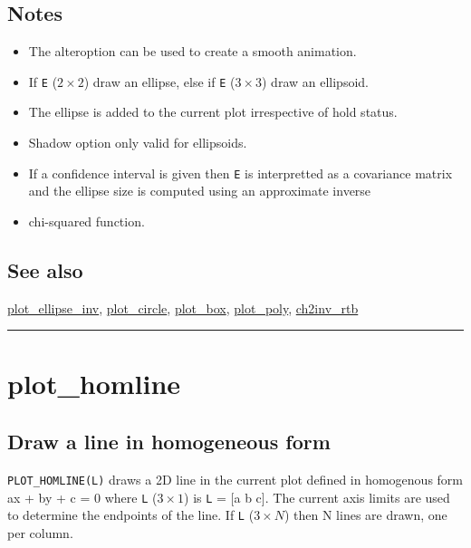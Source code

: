 \subsection*{Notes}
\begin{itemize}
  \item The \textquotesingle alter\textquotesingle  option can be used to create a smooth animation.
  \item If \texttt{E} ($2 \times 2$) draw an ellipse, else if \texttt{E} ($3 \times 3$) draw an ellipsoid.
  \item The ellipse is added to the current plot irrespective of hold status.
  \item Shadow option only valid for ellipsoids.
  \item If a confidence interval is given then \texttt{E} is interpretted as a covariance    matrix and the ellipse size is computed using an approximate inverse
  \item chi-squared function.
\end{itemize}

\subsection*{See also}


\hyperlink{plot_ellipse_inv}{\color{blue} plot\_ellipse\_inv}, \hyperlink{plot_circle}{\color{blue} plot\_circle}, \hyperlink{plot_box}{\color{blue} plot\_box}, \hyperlink{plot_poly}{\color{blue} plot\_poly}, \hyperlink{ch2inv_rtb}{\color{blue} ch2inv\_rtb}

\vspace{1.5ex}\rule{\textwidth}{1mm}

\hypertarget{plot\_homline}{\section*{plot\_homline}}
\subsection*{Draw a line in homogeneous form}


\texttt{PLOT\_HOMLINE(L)} draws a 2D line in the current plot defined in homogenous
form ax + by + c = 0  where \texttt{L} ($3 \times 1$) is \texttt{L} = [a b c].
The current axis limits are used to determine the endpoints of
the line.  If \texttt{L} ($3 \times N$) then N lines are drawn, one per column.



